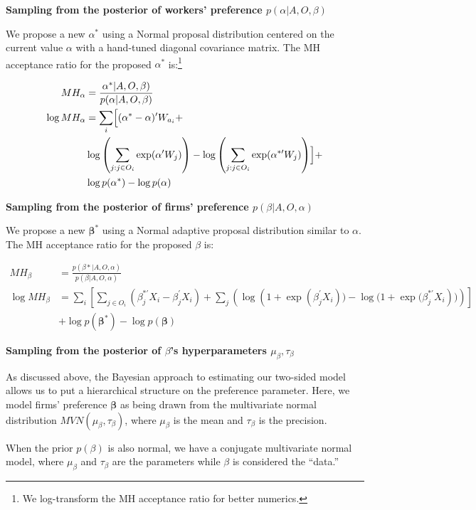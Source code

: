 \textbf{Sampling from the posterior of workers' preference $p(\alpha|A, O,
  \beta)$}

We propose a new $\alpha^*$ using a Normal proposal distribution centered on the
current value $\alpha$ with a hand-tuned diagonal covariance matrix. The MH
acceptance ratio for the proposed $\alpha^*$ is:\footnote{We log-transform the
  MH acceptance ratio for better numerics.}

\begin{align}
  MH_\alpha &= \frac{\alpha^*|A, O, \beta)}{p(\alpha | A, O, \beta)} \\
  \log MH_\alpha &= \sum_i \Bigl[ (\alpha^* - \alpha)' W_{a_i} + \nonumber \\
            & \log\left(\sum\limits_{j:j \in O_i} \exp(\alpha' W_j)\right) -
              \log\left(\sum\limits_{j:j \in O_i} \exp(\alpha^{*\prime} W_j)\right) \Bigr] + \nonumber\\
            & \log p(\alpha^*) - \log p(\alpha)
\end{align}

\textbf{Sampling from the posterior of firms' preference $p(\beta|A, O, \alpha)$}

We propose a new $\bm{\beta}^*$ using a Normal adaptive proposal distribution
similar to $\alpha$. The MH acceptance ratio for the proposed $\beta$ is:

\begin{align}
  MH_\beta &= \frac{p(\beta* | A, O, \alpha)}{p(\beta | A, O, \alpha)} \\
  \log MH_\beta &= \sum_i \left[ \sum_{j \in O_i} \left(\beta_j^{*\prime}X_i - \beta_j^{\prime}X_i \right) + \sum_{j} \left( \log(1 + {\exp({\beta_j^{\prime}X_i})) - \log(1 +  \exp(\beta_j^{*\prime}X_i})) \right) \right] \nonumber \\
                & + \log p(\bm{\beta}^*) - \log p(\bm{\beta})
\end{align}


\textbf{Sampling from the posterior of $\beta$'s hyperparameters $\mu_{\beta}, \tau_{\beta}$}

As discussed above, the Bayesian approach to estimating our two-sided model
allows us to put a hierarchical structure on the preference parameter. Here, we
model firms' preference $\bm{\beta}$ as being drawn from the multivariate normal
distribution $MVN(\mu_{\beta}, \tau_{\beta})$, where $\mu_{\beta}$ is the mean
and $\tau_{\beta}$ is the precision.

When the prior $p(\beta)$ is also normal, we have a conjugate multivariate
normal model, where $\mu_{\beta}$ and $\tau_{\beta}$ are the parameters while
$\beta$ is considered the ``data.''

